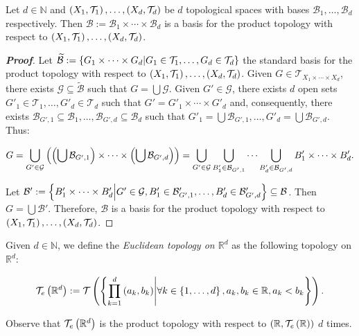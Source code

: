 \begin{proposition}
  Let $d\in\mathbb{N}$ and $\left(X_1,\mathcal{T}_1\right),\dots,\left(X_d,\mathcal{T}_d\right)$ be $d$ topological spaces with bases $\mathcal{B}_1,\dots,\mathcal{B}_d$ respectively. Then $\mathcal{B}:=\mathcal{B}_1\times\cdots\times\mathcal{B}_d$ is a basis for the product topology with respect to $\left(X_1,\mathcal{T}_1\right),\dots,\left(X_d,\mathcal{T}_d\right)$.
  \begin{proof}[\rm\textbf{Proof}]
    Let $\widetilde{\mathcal{B}}:=\left\{G_1\times\cdots\times G_d\middle|G_1\in\mathcal{T}_1,\dots,G_d\in\mathcal{T}_d\right\}$ the standard basis for the product topology with respect to $\left(X_1,\mathcal{T}_1\right),\dots,\left(X_d,\mathcal{T}_d\right)$. Given $G\in\mathcal{T}_{X_1\times\cdots\times X_d}$, there exists $\mathcal{G}\subseteq\widetilde{\mathcal{B}}$ such that $G=\bigcup{\mathcal{G}}$. Given $G'\in\mathcal{G}$, there exists $d$ open sets $G'_1\in\mathcal{T}_1,\dots,G'_d\in\mathcal{T}_d$ such that $G'=G'_1\times\cdots\times G'_d$ and, consequently, there exists $\mathcal{B}_{G',1}\subseteq\mathcal{B}_1,\dots,\mathcal{B}_{G',d}\subseteq\mathcal{B}_d$ such that $G'_1=\bigcup{\mathcal{B}_{G',1}},\dots,G'_d=\bigcup{\mathcal{B}_{G',d}}$. Thus:

    \begin{equation}
      G=\bigcup_{G'\in\mathcal{G}}{\left(\left(\bigcup{\mathcal{B}_{G',1}}\right)\times\cdots\times\left(\bigcup{\mathcal{B}_{G',d}}\right)\right)}=\bigcup_{G'\in\mathcal{G}}{\bigcup_{B'_1\in\mathcal{B}_{G',1}}{\cdots\bigcup_{B'_d\in\mathcal{B}_{G',d}}{B'_1\times\cdots\times B'_d}}}.
    \end{equation}

    Let $\mathcal{B}':=\left\{B'_1\times\cdots\times B'_d\middle|G'\in\mathcal{G},B'_1\in\mathcal{B}'_{G',1},\dots,B'_d\in\mathcal{B}'_{G',d}\right\}\subseteq\mathcal{B}$. Then $G=\bigcup{\mathcal{B}'}$. Therefore, $\mathcal{B}$ is a basis for the product topology with respect to $\left(X_1,\mathcal{T}_1\right),\dots,\left(X_d,\mathcal{T}_d\right)$.
  \end{proof}
\end{proposition}

\begin{example}
  Given $d\in\mathbb{N}$, we define the \emph{Euclidean topology on $\mathbb{R}^d$} as the following topology on $\mathbb{R}^d$:

  \begin{equation}
      \mathcal{T}_e\left(\mathbb{R}^d\right):=\mathcal{T}\left(\left\{\prod_{k=1}^{d}{\left(a_k,b_k\right)}\middle|\forall k\in\left\{1,\dots,d\right\},a_k,b_k\in\mathbb{R},a_k<b_k\right\}\right).
  \end{equation}

  Observe that $\mathcal{T}_e\left(\mathbb{R}^d\right)$ is the product topology with respect to $\left(\mathbb{R},\mathcal{T}_e\left(\mathbb{R}\right)\right)$ $d$ times.
\end{example}


